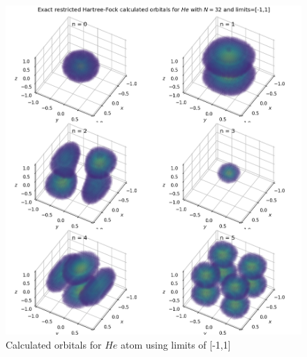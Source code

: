 \documentclass[10pt, oneside, letterpaper]{article}
\begin{document}
\begin{figure}[H]
  \begin{center}
    \includegraphics[scale=0.75]{he_N32_l1.png}
  \end{center}
  \caption{Calculated orbitals for $He$ atom using limits of [-1,1]}
  \label{he-plot-l1}
\end{figure}
\end{document}
